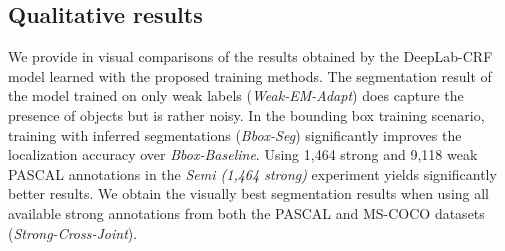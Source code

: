 

\subsection{Qualitative results} 
\label{sec:test_qualitative}

We provide in  visual comparisons of the
results obtained by the DeepLab-CRF model learned with the proposed
training methods. The segmentation result of the model trained on only
weak labels (\textsl{Weak-EM-Adapt}) does capture the presence of
objects but is rather noisy. In the bounding box training scenario,
training with inferred segmentations (\textsl{Bbox-Seg}) significantly
improves the localization accuracy over \textsl{Bbox-Baseline}. Using
1,464 strong and 9,118 weak PASCAL annotations in the \textsl{Semi
  (1,464 strong)} experiment yields significantly better results. We
obtain the visually best segmentation results when using all available
strong annotations from both the PASCAL and MS-COCO datasets
(\textsl{Strong-Cross-Joint}).

